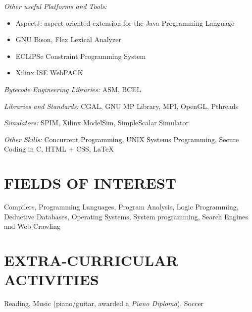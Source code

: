 \documentclass[margin]{res}
\begin{document}
\begin{resume}
        {\sl Other useful Platforms and Tools:}
        \begin{itemize}
        \item AspectJ: aspect-oriented extension for the Java Programming Language
        \item GNU Bison, Flex Lexical Analyzer
        \item ECLiPSe Constraint Programming System
        \item Xilinx ISE WebPACK
        \end{itemize}

        {\sl Bytecode Engineering Libraries:}
        ASM, BCEL

        {\sl Libraries and Standards:}
        CGAL, GNU MP Library, MPI, OpenGL, Pthreads

        {\sl Simulators:}
        SPIM, Xilinx ModelSim, SimpleScalar Simulator

        {\sl Other Skills:}
        Concurrent Programming, UNIX Systems Programming, Secure Coding in C, HTML + CSS, \LaTeX

\section{FIELDS OF INTEREST} Compilers, Programming Languages, Program Analysis, Logic Programming, \\ 
Deductive Databases, Operating Systems, System programming, Search Engines and Web Crawling

\section{EXTRA-CURRICULAR \\ ACTIVITIES}             
Reading, Music (piano/guitar, awarded a {\it Piano Diploma}), Soccer

\end{resume}
\end{document}
